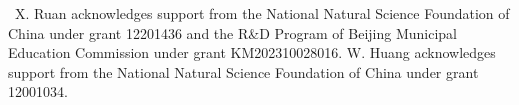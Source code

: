 \documentclass[11pt]{article}
\numberwithin{equation}{section}
\begin{document}
\bigskip
{}  \ 
X. Ruan acknowledges support  from the National Natural Science Foundation of China under grant  12201436 and the R\&D Program of Beijing Municipal Education Commission under grant KM202310028016.
W. Huang acknowledges support  from the National Natural Science Foundation of China under grant  12001034. 








%
%
%
%
%
\end{document}
